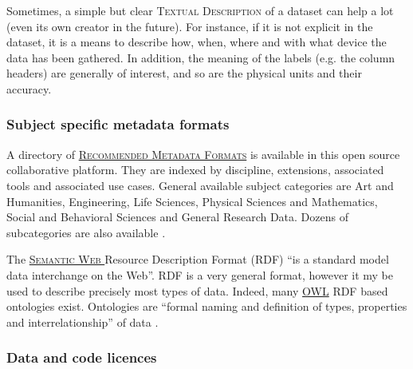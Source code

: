 \vspace{0.4cm}

\noindent Sometimes, a simple but clear  \textsc{Textual Description} of a dataset can help a lot (even its own creator in the future). For instance, if it is not explicit in the dataset, it is a means to describe how, when, where and with what device the data has been gathered. In addition, the meaning of the labels (e.g. the column headers) are generally of interest, and so are the physical units and their accuracy.

\subsubsection{Subject specific metadata formats}

\noindent A directory of   \textsc{\href{http://rd-alliance.github.io/metadata-directory/}{Recommended Metadata Formats}} is available in this open source collaborative platform. They are indexed by discipline, extensions, associated tools and associated use cases. General available subject categories are Art and Humanities, Engineering, Life Sciences, Physical Sciences and Mathematics, Social and Behavioral Sciences and General Research Data. Dozens of subcategories are also available \cite{metadatadirectory_metadata_2015}.

\vspace{0.4cm}

\noindent The  \textsc{\href{http://www.w3.org/RDF/}{Semantic Web }} Resource Description Format (RDF) ``is a standard model data interchange on the Web''\cite{w3c_rdf_2014}. RDF is a very general format, however it my be used to describe precisely most types of data. Indeed, many \href{http://www.w3.org/2001/sw/wiki/OWL}{OWL} \cite{w3c_owl_2009} RDF based ontologies exist. Ontologies are ``formal naming and definition of types, properties and interrelationship'' of data \cite{wikipedia_ontology_2015}.

\subsubsection{Data and code licences}
\label{data_licences}

